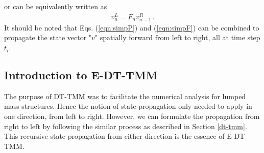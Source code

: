 \documentclass[11pt]{ucthesis}
\begin{document}
or can be equivalently written as
\begin{eqnarray}
v_n^L = F_n v_{n-1}^R \,.
\label{eqn:simpF}
\end{eqnarray}
It should be noted that Eqs. (\ref{eqn:simpP}) and (\ref{eqn:simpF}) can be combined to propagate the state vector "$v$" spatially forward from left to right, all at time step $t_i$.

\subsection{Introduction to E-DT-TMM}    \label{e-dt-tmm}
The purpose of DT-TMM \cite{kumar1986new} was to facilitate the numerical analysis for lumped mass structures. Hence the notion of state propagation only needed to apply in one direction, from left to right. However, we can formulate the propagation from right to left by following the similar process as described in Section \ref{dt-tmm}. This recursive state propagation from either direction is the essence of E-DT-TMM.  
\end{document}
